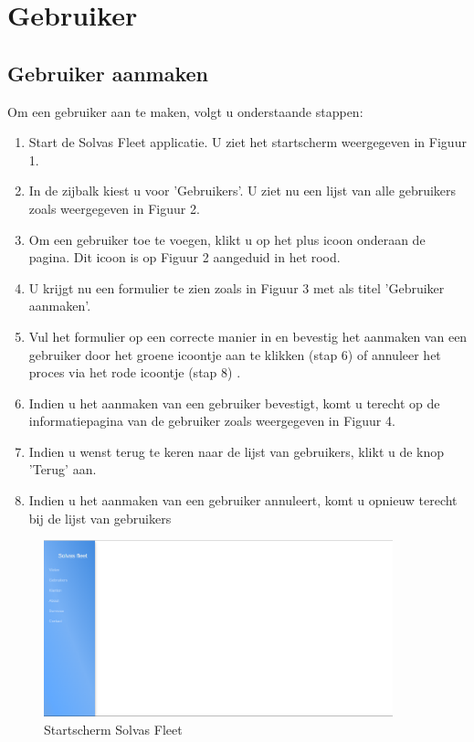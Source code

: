 \documentclass[11pt,openany]{article}
\begin{document}
\newpage
\section{Gebruiker}
\subsection{Gebruiker aanmaken}
Om een gebruiker aan te maken, volgt u onderstaande stappen:
\begin{enumerate}
	\item Start de Solvas Fleet applicatie. U ziet het startscherm weergegeven in Figuur 1.
	\item In de zijbalk kiest u voor 'Gebruikers'. U ziet nu een lijst van alle gebruikers zoals weergegeven in Figuur 2.
	\item Om een gebruiker toe te voegen, klikt u op het plus icoon onderaan de pagina. Dit icoon is op Figuur 2 aangeduid in het rood.
	\item U krijgt nu een formulier te zien zoals	 in Figuur 3 met als titel 'Gebruiker aanmaken'.
	\item Vul het formulier op een correcte manier in en bevestig het aanmaken van een gebruiker door het groene icoontje aan te klikken (stap 6) of annuleer het proces via het rode icoontje (stap 8) .
	\item Indien u het aanmaken van een gebruiker bevestigt, komt u terecht op de informatiepagina van de gebruiker zoals weergegeven in Figuur 4. 
	\item Indien u wenst terug te keren  naar de lijst van gebruikers, klikt u de knop 'Terug' aan.
	\item Indien u het aanmaken van een gebruiker annuleert, komt u opnieuw terecht bij de lijst van gebruikers 
\end{enumerate}
	
	\begin{figure}
		\centering
		\includegraphics[width=0.9\textwidth]{fig1.png}
		\caption{Startscherm Solvas Fleet}
	\end{figure}
\end{document}
